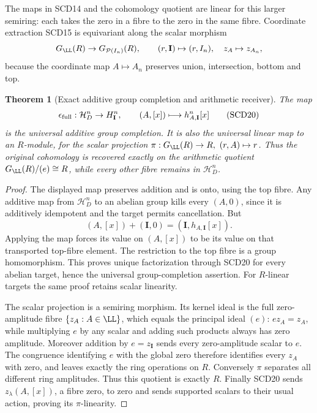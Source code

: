 \documentclass[11pt,a4paper]{article}
\newtheorem{theorem}{Theorem}[section]
\theoremstyle{definition}\newtheorem{definition}[theorem]{Definition}
\begin{document}
The maps in SCD14 and the cohomology quotient are linear for this
larger semiring: each takes the zero in a fibre to the zero in the
same fibre. Coordinate extraction SCD15 is equivariant along the
scalar morphism
\[
 G_{\LL}(R)\to G_{\mathcal P(I_n)}(R),\qquad
 (r,\mathbf I)\mapsto(r,I_n),\quad z_A\mapsto z_{A_n},
\]
because the coordinate map \(A\mapsto A_n\) preserves union,
intersection, bottom and top.

\begin{theorem}[Exact additive group completion and arithmetic receiver]
The map
\[
 \epsilon_{\rm full}:\mathcal H_D^n\to H_{\mathbf I}^n,\qquad
 (A,[x])\longmapsto h_{A,\mathbf I}^n[x]
 \tag{SCD20}
\]
is the universal additive group completion. It is also the universal
linear map to an \(R\)-module, for the scalar projection
\(\pi:G_{\LL}(R)\to R,\ (r,A)\mapsto r\).
Thus the original cohomology is recovered exactly on the arithmetic
quotient \(G_{\LL}(R)/(e)\cong R\), while every other fibre remains
in \(\mathcal H_D^n\).
\end{theorem}
\begin{proof}
The displayed map preserves addition and is onto, using the top
fibre. Any additive map from \(\mathcal H_D^n\) to an abelian group
kills every \((A,0)\), since it is additively idempotent and the
target permits cancellation. But
\[
 (A,[x])+(\mathbf I,0)
 =(\mathbf I,h_{A,\mathbf I}[x]).
\]
Applying the map forces its value on \((A,[x])\) to be its value
on that transported top-fibre element. The restriction to the
top fibre is a group homomorphism. This proves unique factorization
through SCD20 for every abelian target, hence the universal
group-completion assertion. For \(R\)-linear targets the same proof
retains scalar linearity.

The scalar projection is a semiring morphism. Its kernel ideal
is the full zero-amplitude fibre \(\{z_A:A\in\LL\}\), which equals
the principal ideal \((e)\): \(ez_A=z_A\), while multiplying \(e\)
by any scalar and adding such products always has zero amplitude.
Moreover addition by \(e=z_{\mathbf I}\) sends every zero-amplitude
scalar to \(e\). The congruence identifying \(e\) with the global
zero therefore identifies every \(z_A\) with zero, and leaves
exactly the ring operations on \(R\). Conversely \(\pi\) separates
all different ring amplitudes. Thus this quotient is exactly \(R\).
Finally SCD20 sends \(z_\lambda(A,[x])\), a fibre zero, to zero
and sends supported scalars to their usual action, proving its
\(\pi\)-linearity.
\end{proof}
\end{document}
